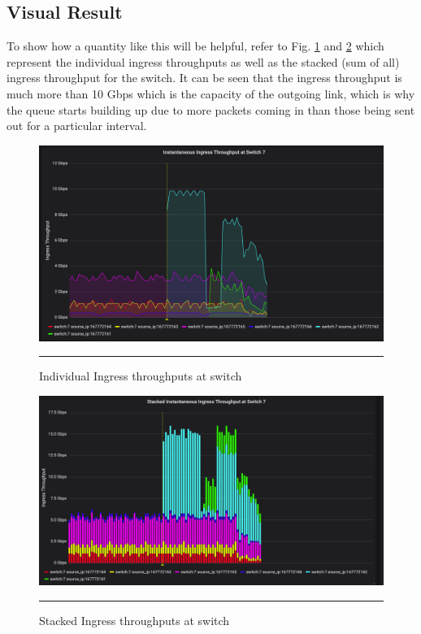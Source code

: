 \subsection{Visual Result}
To show how a quantity like this will be helpful, refer to Fig. \ref{fig:Ing_Ind} and \ref{fig:Ing_Stacked} which represent the individual ingress throughputs as well as the stacked (sum of all) ingress throughput
for the switch. It can be seen that the ingress throughput is much more than 10 Gbps which is the capacity of the outgoing link, which is why the queue starts building up due to more packets
coming in than those being sent out for a particular interval.

\begin{figure}[htbp]
	\centering
		\includegraphics[width=1.0\columnwidth]{Figures/ingress_individual.png}
		\rule{35em}{0.5pt}
	\caption[Individual Ingress Throughputs]{Individual Ingress throughputs at switch}
	\label{fig:Ing_Ind}
\end{figure}

\begin{figure}[htbp]
	\centering
		\includegraphics[width=1.0\columnwidth]{Figures/ingress_stacked.png}
		\rule{35em}{0.5pt}
	\caption[Stacked Ingress Throughputs]{Stacked Ingress throughputs at switch}
	\label{fig:Ing_Stacked}
\end{figure}

